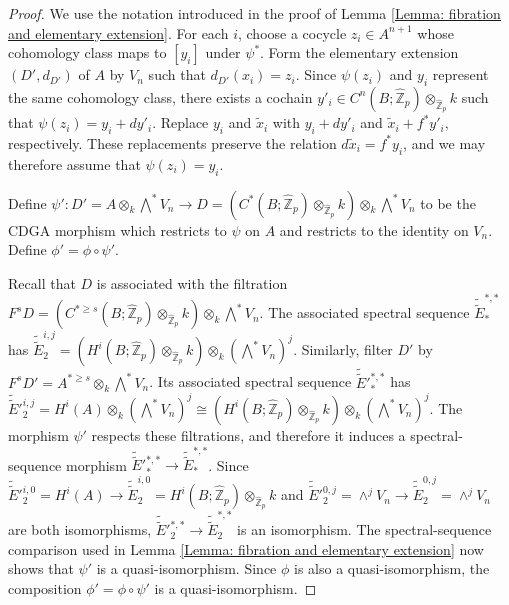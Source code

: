 \documentclass[11pt]{amsart}
\theoremstyle{definition}
\numberwithin{equation}{section}
\numberwithin{equation}{section}
\newcommand\ZZ{\mathbb{Z}}
\begin{document}
\begin{proof}
We use the notation introduced in the proof of Lemma \ref{Lemma: fibration and elementary extension}. For each $i$, choose a cocycle $z_i\in A^{n+1}$ whose cohomology class maps to $[y_i]$ under $\psi^*$. Form the elementary extension $(D',d_{D'})$ of $A$ by $V_n$ such that $d_{D'}(x_i)=z_i$.  Since $\psi(z_i)$ and $y_i$ represent the same cohomology class, there exists a cochain $y'_i\in C^{n}(B;\widehat{\ZZ}_p)\otimes_{\widehat{\ZZ}_p} k$ such that $\psi(z_i)=y_i+dy'_i$. Replace $y_i$ and $\widetilde{x}_i$ with $y_i+dy'_i$ and $\widetilde{x}_i+f^*y'_i$, respectively. These replacements preserve the relation $d\widetilde{x}_i=f^*y_i$, and we may therefore assume that $\psi(z_i)=y_i$.

Define $\psi':D'=A\otimes_{k} \bigwedge^* V_n\rightarrow D=(C^*(B;\widehat{\ZZ}_p)\otimes_{\widehat{\ZZ}_p} k)\otimes_{k} \bigwedge^* V_n$ to be the CDGA morphism which restricts to $\psi$ on $A$ and restricts to the identity on $V_n$. Define $\phi'=\phi\circ \psi'$.

Recall that $D$ is associated with the filtration $F^s D=(C^{*\geq s}(B;\widehat{\ZZ}_p)\otimes_{\widehat{\ZZ}_p} k)\otimes_{k}\bigwedge^* V_n$. The associated spectral sequence $\widetilde{\widetilde{E}}^{*,*}_*$ has $\widetilde{\widetilde{E}}^{i,j}_2=(H^i(B;\widehat{\ZZ}_p)\otimes_{\widehat{\ZZ}_p}k)\otimes_{k} (\bigwedge^* V_n)^j$. Similarly, filter $D'$ by $F^s D'=A^{*\geq s}\otimes_{k}\bigwedge^*V_n$. Its associated spectral sequence $\widetilde{\widetilde{E}}'^{*,*}_*$ has $\widetilde{\widetilde{E}}'^{i,j}_2=H^i(A)\otimes_k (\bigwedge^* V_n)^j\cong (H^i(B;\widehat{\ZZ}_p)\otimes_{\widehat{\ZZ}_p}k)\otimes_{k} (\bigwedge^* V_n)^j$. The morphism $\psi'$ respects these filtrations, and therefore it induces a spectral-sequence morphism $\widetilde{\widetilde{E}}'^{*,*}_*\rightarrow \widetilde{\widetilde{E}}^{*,*}_*$. Since $\widetilde{\widetilde{E}}'^{i,0}_2=H^i(A)\rightarrow \widetilde{\widetilde{E}}^{i,0}_2=H^i(B;\widehat{\ZZ}_p)\otimes_{\widehat{\ZZ}_p}k$ and $\widetilde{\widetilde{E}}'^{0,j}_2=\wedge^j V_n\rightarrow \widetilde{\widetilde{E}}^{0,j}_2=\wedge^j V_n$ are both isomorphisms, $\widetilde{\widetilde{E}}'^{*,*}_2\rightarrow \widetilde{\widetilde{E}}^{*,*}_2$ is an isomorphism. The spectral-sequence comparison used in Lemma \ref{Lemma: fibration and elementary extension} now shows that $\psi'$ is a quasi-isomorphism. Since $\phi$ is also a quasi-isomorphism, the composition $\phi'=\phi\circ \psi'$ is a quasi-isomorphism.
\end{proof}
\end{document}
